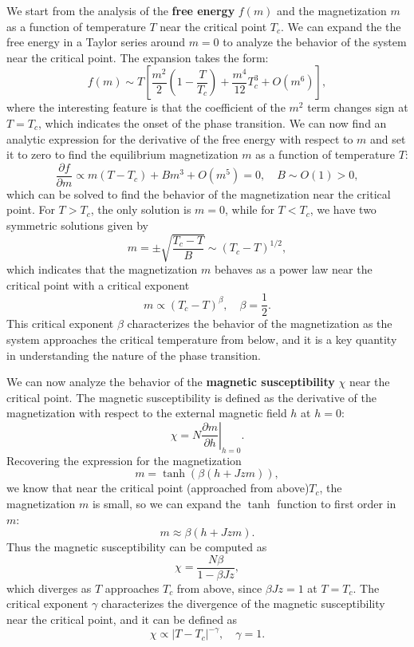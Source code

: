 We start from the analysis of the \textbf{free energy} \(f(m)\) and the magnetization \(m\) as a function of temperature \(T\) near the critical point \(T_c\). We can expand the the free energy in a Taylor series around \(m = 0\) to analyze the behavior of the system near the critical point. The expansion takes the form:
\[
    f(m) \sim T \left[ \frac{m^2}{2}\left(1-\frac{T}{T_c}\right) + \frac{m^4}{12} T_c^3 + O(m^6) \right],
\]
where the interesting feature is that the coefficient of the \(m^2\) term changes sign at \(T = T_c\), which indicates the onset of the phase transition. We can now find an analytic expression for the derivative of the free energy with respect to \(m\) and set it to zero to find the equilibrium magnetization \(m\) as a function of temperature \(T\):
\[
    \frac{\partial f}{\partial m} \propto m(T - T_c) + B m^3 + O(m^5) = 0, \quad B \sim O(1) > 0,
\]
which can be solved to find the behavior of the magnetization near the critical point. For \(T > T_c\), the only solution is \(m = 0\), while for \(T < T_c\), we have two symmetric solutions given by
\[
    m = \pm \sqrt{\frac{T_c - T}{B}} \sim (T_c - T)^{1/2},
\]
which indicates that the magnetization \(m\) behaves as a power law near the critical point with a critical exponent
\[
    m \propto (T_c - T)^{\beta}, \quad \beta = \frac{1}{2}.
\]
This critical exponent \(\beta\) characterizes the behavior of the magnetization as the system approaches the critical temperature from below, and it is a key quantity in understanding the nature of the phase transition.

We can now analyze the behavior of the \textbf{magnetic susceptibility} \(\chi\) near the critical point. The magnetic susceptibility is defined as the derivative of the magnetization with respect to the external magnetic field \(h\) at \(h = 0\):
\[
    \chi = \left. N\frac{\partial m}{\partial h} \right|_{h=0}.
\]
Recovering the expression for the magnetization
\[
    m = \tanh\left( \beta (h + J z m) \right),
\]
we know that near the critical point (approached from above)\(T_c\), the magnetization \(m\) is small, so we can expand the \(\tanh\) function to first order in \(m\):
\[
    m \approx \beta (h + J z m).
\]
Thus the magnetic susceptibility can be computed as
\[
    \chi = \frac{N \beta}{1 - \beta J z},
\]
which diverges as \(T\) approaches \(T_c\) from above, since \(\beta J z = 1\) at \(T = T_c\). The critical exponent \(\gamma\) characterizes the divergence of the magnetic susceptibility near the critical point, and it can be defined as
\[
    \chi \propto |T - T_c|^{-\gamma}, \quad \gamma = 1.
\]

